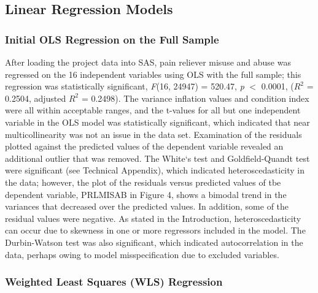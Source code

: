 \documentclass[sigconf]{acmart}
\begin{document}

\subsection{Linear Regression Models}

\subsubsection{Initial OLS Regression on the Full Sample} 
 
After loading the project data into SAS, pain reliever misuse and abuse was 
regressed on the 16 independent variables using OLS with the full sample; 
this regression was statistically significant, \textit{F}(16, 24947) = 
520.47, \textit{p} $<$ 0.0001, ($R^2$ = 0.2504, adjusted $R^2$ = 0.2498). The 
variance inflation values and condition index were all within acceptable ranges, 
and the t-values for all but one independent variable in the OLS model was 
statistically significant, which indicated that near multicollinearity was 
not an issue in the data set. Examination of the residuals plotted against 
the predicted values of the dependent variable revealed an additional outlier 
that was removed. The White`s test and Goldfield-Quandt test were significant
(see Technical Appendix), which indicated heteroscedasticity in the data; 
however, the plot of the residuals versus predicted values of tbe dependent
variable, PRLMISAB in Figure 4, shows a bimodal trend in the variances that 
decreased over the predicted values. In addition, some of the residual values 
were negative. As stated in the Introduction, heteroscedasticity can occur 
due to skewness in one or more regressors included in the model. The 
Durbin-Watson test was also significant, which indicated autocorrelation 
in the data, perhaps owing to model misspecification due to excluded 
variables. 


\subsubsection{Weighted Least Squares (WLS) Regression} 
\end{document}

